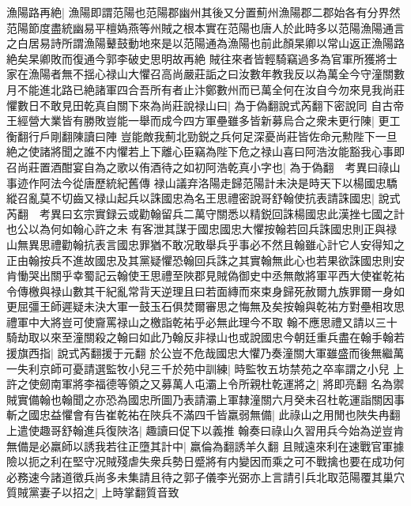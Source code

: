 漁陽路再絶|{
	漁陽即謂范陽也范陽郡幽州其後又分置薊州漁陽郡二郡始各有分界然范陽節度盡統幽易平檀媯燕等州賊之根本實在范陽也唐人於此時多以范陽漁陽通言之白居易詩所謂漁陽鼙鼓動地來是以范陽通為漁陽也前此顏杲卿以常山返正漁陽路絶矣杲卿敗而復通今郭李破史思明故再絶}
賊往來者皆輕騎竊過多為官軍所獲將士家在漁陽者無不揺心禄山大懼召高尚嚴莊詬之曰汝數年教我反以為萬全今守潼關數月不能進北路已絶諸軍四合吾所有者止汴鄭數州而已萬全何在汝自今勿來見我尚莊懼數日不敢見田乾真自關下來為尚莊說禄山曰|{
	為于偽翻說式芮翻下密說同}
自古帝王經營大業皆有勝敗豈能一舉而成今四方軍壘雖多皆新募烏合之衆未更行陳|{
	更工衡翻行戶剛翻陳讀曰陣}
豈能敵我薊北勁鋭之兵何足深憂尚莊皆佐命元勲陛下一旦絶之使諸將聞之誰不内懼若上下離心臣竊為陛下危之禄山喜曰阿浩汝能豁我心事即召尚莊置酒酣宴自為之歌以侑酒待之如初阿浩乾真小字也|{
	為于偽翻　考異曰祿山事迹作阿法今從唐歷統紀舊傳}
禄山議弃洛陽走歸范陽計未決是時天下以楊國忠驕縱召亂莫不切齒又禄山起兵以誅國忠為名王思禮密說哥舒翰使抗表請誅國忠|{
	說式芮翻　考異曰玄宗實録云或勸翰留兵二萬守關悉以精鋭回誅楊國忠此漢挫七國之計也公以為何如翰心許之未有客泄其謀于國忠國忠大懼按翰若回兵誅國忠則正與禄山無異思禮勸翰抗表言國忠罪猶不敢况敢舉兵乎事必不然且翰雖心計它人安得知之正由翰按兵不進故國忠及其黨疑懼恐翰回兵誅之其實翰無此心也若果欲誅國忠則安肯慟哭出關乎幸蜀記云翰使王思禮至陜郡見賊偽御史中丞無敵將軍平西大使崔乾祐令傳檄與禄山數其干紀亂常背天逆理且曰若面縳而來束身歸死赦爾九族罪爾一身如更屈彊王師遲疑未決大軍一鼓玉石俱焚爾審思之悔無及矣按翰與乾祐方對壘相攻思禮軍中大將豈可使齎罵禄山之檄詣乾祐乎必無此理今不取}
翰不應思禮又請以三十騎劫取以來至潼關殺之翰曰如此乃翰反非禄山也或說國忠今朝廷重兵盡在翰手翰若援旗西指|{
	說式芮翻援于元翻}
於公豈不危哉國忠大懼乃奏潼關大軍雖盛而後無繼萬一失利京師可憂請選監牧小兒三千於苑中訓練|{
	時監牧五坊禁苑之卒率謂之小兒}
上許之使劒南軍將李福德等領之又募萬人屯灞上令所親杜乾運將之|{
	將即亮翻}
名為禦賊實備翰也翰聞之亦恐為國忠所圖乃表請灞上軍隸潼關六月癸未召杜乾運詣關因事斬之國忠益懼會有告崔乾祐在陜兵不滿四千皆羸弱無備|{
	此祿山之用閒也陜失冉翻}
上遣使趣哥舒翰進兵復陜洛|{
	趣讀曰促下以義推}
翰奏曰祿山久習用兵今始為逆豈肯無備是必羸師以誘我若往正墮其計中|{
	羸倫為翻誘羊久翻}
且賊遠來利在速戰官軍據險以扼之利在堅守况賊殘虐失衆兵勢日蹙將有内變因而乘之可不戰擒也要在成功何必務速今諸道徵兵尚多未集請且待之郭子儀李光弼亦上言請引兵北取范陽覆其巢穴質賊黨妻子以招之|{
	上時掌翻質音致}
